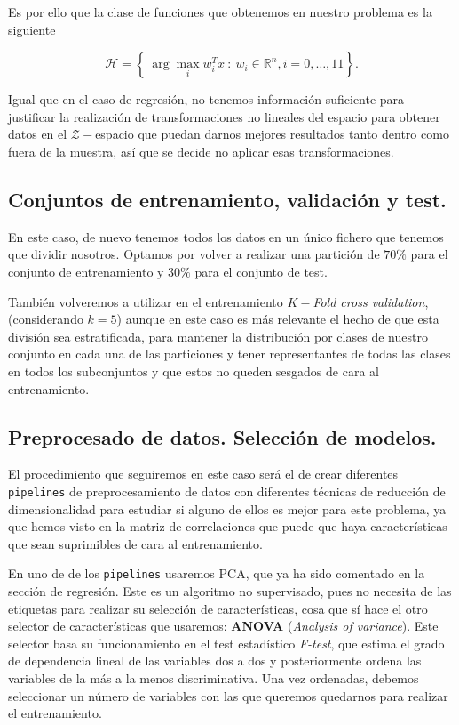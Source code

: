 \documentclass[a4paper, 20pt]{article}
\newcommand{\R}{\mathbb R}
\begin{document}
Es por ello que la clase de funciones que obtenemos en nuestro problema es la siguiente

$$
\mathcal H = \left\{ \ \arg \max_i w_i^T x  \ : \ w_i \in \R^n, i = 0,\dots,11\right\}.
$$

Igual que en el caso de regresión, no tenemos información suficiente para justificar la realización de transformaciones no lineales del espacio para obtener datos en el $\mathcal Z-$espacio que puedan darnos mejores resultados tanto dentro como fuera de la muestra, así que se decide no aplicar esas transformaciones.

\subsection{Conjuntos de entrenamiento, validación y test.}

En este caso, de nuevo tenemos todos los datos en un único fichero que tenemos que dividir nosotros. Optamos por volver a realizar una partición de $70\%$ para el conjunto de entrenamiento y $30\%$ para el conjunto de test.

También volveremos a utilizar en el entrenamiento $K-$\emph{Fold cross validation}, (considerando $k=5$) aunque en este caso es más relevante el hecho de que esta división sea estratificada, para mantener la distribución por clases de nuestro conjunto en cada una de las particiones y tener representantes de todas las clases en todos los subconjuntos y que estos no queden sesgados de cara al entrenamiento.

\subsection{Preprocesado de datos. Selección de modelos.}

El procedimiento que seguiremos en este caso será el de crear diferentes \lstinline{pipelines} de preprocesamiento de datos con diferentes técnicas de reducción de dimensionalidad para estudiar si alguno de ellos es mejor para este problema, ya que hemos visto en la matriz de correlaciones que puede que haya características que sean suprimibles de cara al entrenamiento.

En uno de de los \lstinline{pipelines} usaremos PCA, que ya ha sido comentado en la sección de regresión. Este es un algoritmo no supervisado, pues no necesita de las etiquetas para realizar su selección de características, cosa que sí hace el otro selector de características que usaremos: \textbf{ANOVA} (\emph{Analysis of variance}). Este selector basa su funcionamiento en el test estadístico \emph{F-test}, que estima el grado de dependencia lineal de las variables dos a dos y posteriormente ordena las variables de la más a la menos discriminativa. Una vez ordenadas, debemos seleccionar un número de variables con las que queremos quedarnos para realizar el entrenamiento.
\end{document}
